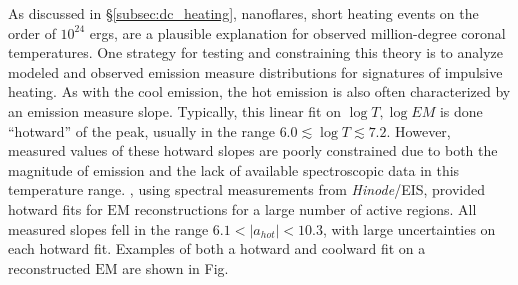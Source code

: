 \par As discussed in \S\ref{subsec:dc_heating}, nanoflares, short heating events on the order of $10^{24}$ ergs, are a plausible explanation for observed million-degree coronal temperatures. One strategy for testing and constraining this theory is to analyze modeled and observed emission measure distributions for signatures of impulsive heating. As with the cool emission, the hot emission is also often characterized by an emission measure slope. Typically, this linear fit on $\log{T},\log{EM}$ is done ``hotward'' of the peak, usually in the range $6.0\lesssim\log{T}\lesssim7.2$. However, measured values of these hotward slopes are poorly constrained due to both the magnitude of emission and the lack of available spectroscopic data in this temperature range. \citet{warren_systematic_2012}, using spectral measurements from \textit{Hinode}/EIS, provided hotward fits for $\mathrm{EM}$ reconstructions for a large number of active regions. All measured slopes fell in the range $6.1<|a_{hot}|<10.3$, with large uncertainties on each hotward fit. Examples of both a hotward and coolward fit on a reconstructed $\mathrm{EM}$ are shown in Fig. 
%
